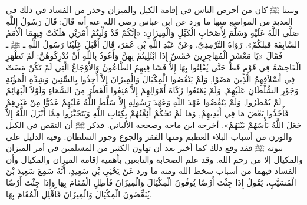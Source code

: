 ونبينا ﷺ كان من أحرص الناس في إقامة الكيل والميزان وحذر من الفساد في ذلك في العديد من المواضع منها ما ورد عن ابن عباس رضي الله عنه أنه قَالَ: قَالَ رَسُولُ اللَّهِ صَلَّى اللَّهُ عَلَيْهِ وَسَلَّمَ لِأَصْحَابِ الْكَيْلِ وَالْمِيزَانِ: «إِنَّكُمْ قَدْ وُلِّيتُمْ أَمْرَيْنِ هَلَكَتْ فِيهِمَا الْأُمَمُ السَّابِقَة قبلكُمْ».
{\footnotesize رَوَاهُ التِّرْمِذِيّ}.
وعَنْ عَبْدِ اللَّهِ بْنِ عُمَرَ، قَالَ أَقْبَلَ عَلَيْنَا رَسُولُ اللَّهِ ـ ﷺ ـ فَقَالَ «يَا مَعْشَرَ الْمُهَاجِرِينَ خَمْسٌ إِذَا ابْتُلِيتُمْ بِهِنَّ وَأَعُوذُ بِاللَّهِ أَنْ تُدْرِكُوهُنَّ: لَمْ تَظْهَرِ الْفَاحِشَةُ فِي قَوْمٍ قَطُّ حَتَّى يُعْلِنُوا بِهَا إِلاَّ فَشَا فِيهِمُ الطَّاعُونُ وَالأَوْجَاعُ الَّتِي لَمْ تَكُنْ مَضَتْ فِي أَسْلاَفِهِمُ الَّذِينَ مَضَوْا, وَلَمْ يَنْقُصُوا الْمِكْيَالَ وَالْمِيزَانَ إِلاَّ أُخِذُوا بِالسِّنِينَ وَشِدَّةِ الْمَؤُنَةِ وَجَوْرِ السُّلْطَانِ عَلَيْهِمْ, وَلَمْ يَمْنَعُوا زَكَاةَ أَمْوَالِهِمْ إِلاَّ مُنِعُوا الْقَطْرَ مِنَ السَّمَاءِ وَلَوْلاَ الْبَهَائِمُ لَمْ يُمْطَرُوا, وَلَمْ يَنْقُضُوا عَهْدَ اللَّهِ وَعَهْدَ رَسُولِهِ إِلاَّ سَلَّطَ اللَّهُ عَلَيْهِمْ عَدُوًّا مِنْ غَيْرِهِمْ فَأَخَذُوا بَعْضَ مَا فِي أَيْدِيهِمْ, وَمَا لَمْ تَحْكُمْ أَئِمَّتُهُمْ بِكِتَابِ اللَّهِ وَيَتَخَيَّرُوا مِمَّا أَنْزَلَ اللَّهُ إِلاَّ جَعَلَ اللَّهُ بَأْسَهُمْ بَيْنَهُمْ».
{\footnotesize أخرجه ابن ماجه وصححه الألباني}.
فذكر ﷺ أن النقص في الكيل والوزن من أسباب البلاء العظيم ومنها الفقر والجوع وجور السلطان. وفيه الدليل على نبوته ﷺ فقد وقع ذلك كما أخبر بعد أن تهاون الكثير من المسلمين في أمر الميزان والمكيال إلا من رحم الله. وقد علم الصحابة والتابعين بأهمية إقامة الميزان والمكيال وأن الفساد فيهما من أسباب سخط الله ومنه ما ورد عَنْ يَحْيَى بْنِ سَعِيدٍ، أَنَّهُ سَمِعَ سَعِيدَ بْنَ الْمُسَيَّبِ، يَقُولُ إِذَا جِئْتَ أَرْضًا يُوفُونَ الْمِكْيَالَ وَالْمِيزَانَ فَأَطِلِ الْمُقَامَ بِهَا وَإِذَا جِئْتَ أَرْضًا يُنَقِّصُونَ الْمِكْيَالَ وَالْمِيزَانَ فَأَقْلِلِ الْمُقَامَ بِهَا.

